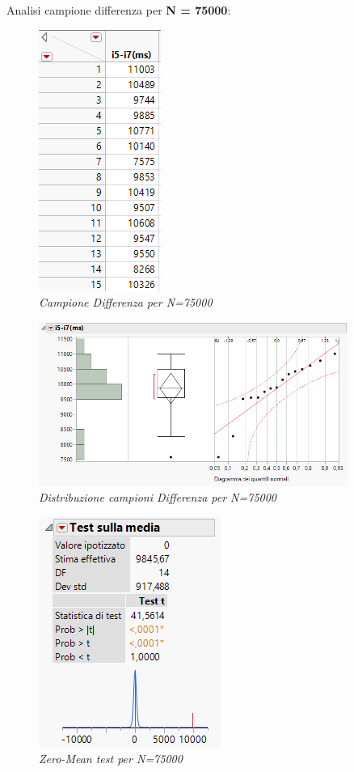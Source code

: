 Analisi campione differenza per \textbf{N = 75000}:
\begin{figure}[H]
	\centering
	\includegraphics{img/hw0/diff4.png}
	\caption{\textit{Campione Differenza per N=75000}}
\end{figure}
\begin{figure}[H]
	\centering
	\includegraphics[width=0.9\textwidth]{img/hw0/statistiche75000.png}
	\caption{\textit{Distribuzione campioni Differenza per N=75000}}
\end{figure}
\begin{figure}[H]
	\centering
	\includegraphics{img/hw0/test75000.png}
	\caption{\textit{Zero-Mean test per N=75000}}
\end{figure}

